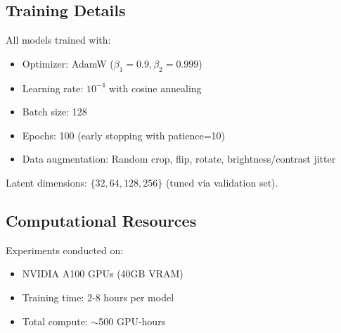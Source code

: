 \subsection{Training Details}

All models trained with:
\begin{itemize}
    \item Optimizer: AdamW ($\beta_1=0.9, \beta_2=0.999$)
    \item Learning rate: $10^{-4}$ with cosine annealing
    \item Batch size: 128
    \item Epochs: 100 (early stopping with patience=10)
    \item Data augmentation: Random crop, flip, rotate, brightness/contrast jitter
\end{itemize}

Latent dimensions: $\{32, 64, 128, 256\}$ (tuned via validation set).

\subsection{Computational Resources}

Experiments conducted on:
\begin{itemize}
    \item NVIDIA A100 GPUs (40GB VRAM)
    \item Training time: 2-8 hours per model
    \item Total compute: $\sim$500 GPU-hours
\end{itemize}

